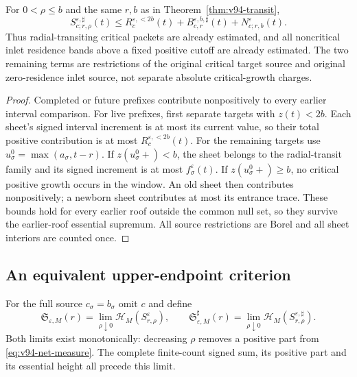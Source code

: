 \begin{proposition}
\label{prop:v94-localization}
For $0<\rho\le b$ and the same $r,b$ as in
Theorem~\ref{thm:v94-transit},
\begin{equation}\label{eq:v94-localization}
 S_{c;r,\rho}^{\varepsilon,\sharp}(t)
 \le R_c^{\varepsilon,<2b}(t)
              +B_{c,r}^{\varepsilon,b,\sharp}(t)
              +N_{c;r,b}^\varepsilon(t).
\end{equation}
Thus radial-transiting critical packets are already estimated, and
all noncritical inlet residence bands above a fixed positive cutoff
are already estimated. The two remaining terms are restrictions of
the original critical target source and original zero-residence inlet
source, not separate absolute critical-growth charges.
\end{proposition}
\begin{proof}
Completed or future prefixes contribute nonpositively to every earlier
interval comparison. For live prefixes, first separate targets with
$z(t)<2b$. Each sheet's signed interval increment is at most its
current value, so their total positive contribution is at most
$R_c^{\varepsilon,<2b}(t)$. For the remaining targets use
$u_\sigma^0=\max(a_\sigma,t-r)$. If $z(u_\sigma^0+)<b$, the sheet
belongs to the radial-transit family and its signed increment is at
most $f_\sigma^\varepsilon(t)$. If $z(u_\sigma^0+)\ge b$, no critical
positive growth occurs in the window. An old sheet then contributes
nonpositively; a newborn sheet contributes at most its entrance trace.
These bounds hold for every earlier roof outside the common null set,
so they survive the earlier-roof essential supremum. All source
restrictions are Borel and all sheet interiors are counted once.
\end{proof}

\subsection{An equivalent upper-endpoint criterion}
For the full source $c_\sigma=b_\sigma$ omit $c$ and define
\[
 \mathfrak S_{\varepsilon,M}(r)
  =\lim_{\rho\downarrow0}\mathcal H_M(S_{r,\rho}^\varepsilon),
 \qquad
 \mathfrak S_{\varepsilon,M}^{\sharp}(r)
  =\lim_{\rho\downarrow0}\mathcal H_M(S_{r,\rho}^{\varepsilon,\sharp}).
\]
Both limits exist monotonically: decreasing $\rho$ removes a positive
part from \eqref{eq:v94-net-measure}. The complete finite-count signed
sum, its positive part and its essential height all precede this limit.

